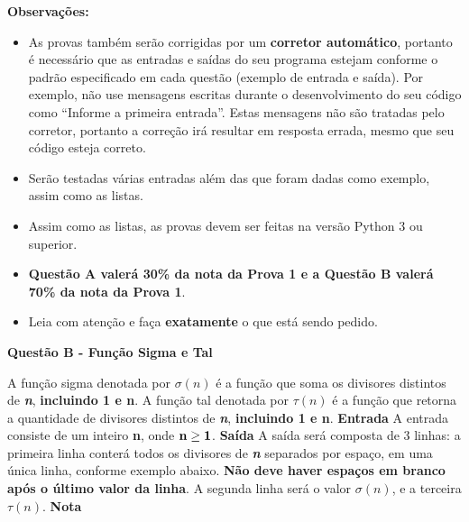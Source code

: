 \documentclass[a4paper, 12pt]{article}
\begin{document}
\textbf{{\large Observações:}}
\begin{itemize}
	\item As provas também serão corrigidas por um \textbf{corretor automático}, portanto é necessário que as entradas e saídas do seu programa estejam conforme o padrão especificado em cada questão (exemplo de entrada e saída). Por exemplo, não use mensagens escritas durante o desenvolvimento do seu código como “Informe a primeira entrada”. Estas mensagens não são tratadas pelo corretor, portanto a correção irá resultar em resposta errada, mesmo que seu código esteja correto.
	\item Serão testadas várias entradas além das que foram dadas como exemplo, assim como as listas.
	\item Assim como as listas, as provas devem ser feitas na versão Python 3 ou superior.
	\item \textbf{Questão A valerá 30\% da nota da Prova 1 e a Questão B valerá 70\% da nota da Prova 1}.
	\item Leia com atenção e faça \textbf{exatamente} o que está sendo pedido.
\end{itemize}
\newpage %
\begin{center}
\textbf{{\Large Questão B - Função Sigma e Tal}}
\end{center}
\vspace{5pt}
A função sigma denotada por $\sigma(n)$ é a função que soma os divisores distintos de \textbf{\textit{n}}, \textbf{incluindo 1 e n}. A função tal denotada por $\tau(n)$ é a função que retorna
a quantidade de divisores distintos de \textbf{\textit{n}}, \textbf{incluindo 1 e n}. 
\newline \newline
\textbf{{\large Entrada}} \newline
A entrada consiste de um inteiro \textbf{n}, onde $\textrm{\textbf{n}} \geq \textrm{\textbf{1}}$.
\newline \newline
\textbf{{\large Saída}} \newline
A saída será composta de 3 linhas: a primeira linha conterá todos os divisores de \textbf{\textit{n}} separados por espaço, em uma única linha, conforme exemplo abaixo. \textbf{Não deve haver espaços em branco após o último valor da linha}. A segunda linha será o valor $\sigma(n)$, e a terceira $\tau(n)$.
\newline \newline
\textbf{{\large Nota}} \newline
\end{document}
